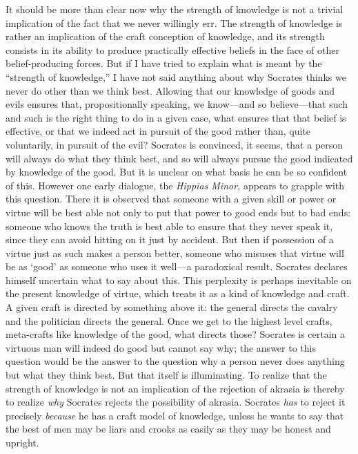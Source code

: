 \documentclass[11pt]{amsart}
\begin{document}
It should be more than clear now why the strength of knowledge is not
a trivial implication of the fact that we never willingly err. The
strength of knowledge is rather an implication of the craft conception
of knowledge, and its strength consists in its ability to produce
practically effective beliefs in the face of other belief-producing
forces. But if I have tried to explain what is meant by the ``strength
of knowledge,'' I have not said anything about why Socrates thinks we
never do other than we think best. Allowing that our knowledge of
goods and evils ensures that, propositionally speaking, we know---and
so believe---that such and such is the right thing to do in a given
case, what ensures that that belief is effective, or that we indeed
act in pursuit of the good rather than, quite voluntarily, in pursuit
of the evil? Socrates is convinced, it seems, that a person will
always do what they think best, and so will always pursue the good
indicated by knowledge of the good. But it is unclear on what basis he
can be so confident of this. However one early dialogue, the
\emph{Hippias Minor,} appears to grapple with this question. There it
is observed that someone with a given skill or power or virtue will be
best able not only to put that power to good ends but to bad ends:
someone who knows the truth is best able to ensure that they never
speak it, since they can avoid hitting on it just by accident. But
then if possession of a virtue just as such makes a person better,
someone who misuses that virtue will be as `good' as someone who uses
it well---a paradoxical result. Socrates declares himself uncertain
what to say about this. This perplexity is perhaps inevitable on the
present knowledge of virtue, which treats it as a kind of knowledge
and craft. A given craft is directed by something above it: the
general directs the cavalry and the politician directs the general.
Once we get to the highest level crafts, meta-crafts like knowledge of
the good, what directs those? Socrates is certain a virtuous man will
indeed do good but cannot say why; the answer to this question would
be the answer to the question why a person never does anything but
what they think best. But that itself is illuminating. To realize that
the strength of knowledge is not an implication of the rejection of
akrasia is thereby to realize \emph{why} Socrates rejects the
possibility of akrasia. Socrates \emph{has} to reject it precisely
\emph{because} he has a craft model of knowledge, unless he wants to
say that the best of men may be liars and crooks as easily as they may
be honest and upright.
\end{document}
